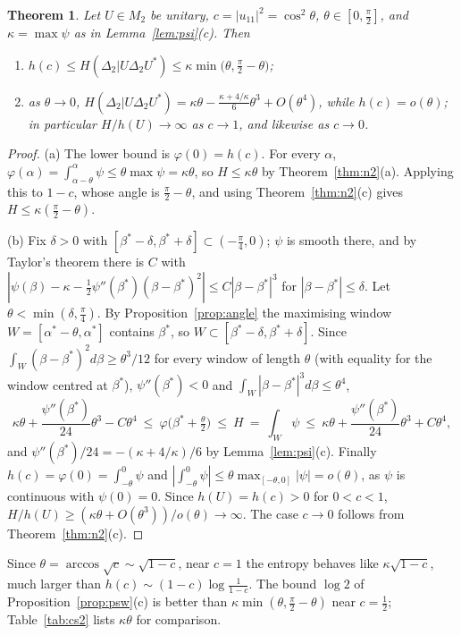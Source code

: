 \documentclass[11pt]{article}
\theoremstyle{plain}
\newtheorem{theorem}{Theorem}[section]
\theoremstyle{definition}
\theoremstyle{remark}
\begin{document}
\begin{theorem}\label{thm:bound}
Let $U\in M_2$ be unitary, $c=|u_{11}|^2=\cos^2\theta$, $\theta\in[0,\frac\pi2]$, and $\kappa=\max\psi$ as in
Lemma~\ref{lem:psi}(c). Then
\begin{enumerate}
\item[(a)] $h(c)\le H(\Delta_2|U\Delta_2U^*)\le\kappa\min\bigl(\theta,\frac\pi2-\theta\bigr)$;
\item[(b)] as $\theta\to0$,
$H(\Delta_2|U\Delta_2U^*)=\kappa\theta-\frac{\kappa+4/\kappa}6\theta^3+O(\theta^4)$, while $h(c)=o(\theta)$; in particular
$H/h(U)\to\infty$ as $c\to1$, and likewise as $c\to0$.
\end{enumerate}
\end{theorem}
\begin{proof}
(a) The lower bound is $\varphi(0)=h(c)$. For every $\alpha$, $\varphi(\alpha)=\int_{\alpha-\theta}^\alpha\psi\le\theta\max\psi=\kappa\theta$, so
$H\le\kappa\theta$ by Theorem~\ref{thm:n2}(a). Applying this to $1-c$, whose angle is $\frac\pi2-\theta$, and using
Theorem~\ref{thm:n2}(c) gives $H\le\kappa(\frac\pi2-\theta)$.

(b) Fix $\delta>0$ with $[\beta^*-\delta,\beta^*+\delta]\subset(-\frac\pi4,0)$; $\psi$ is smooth there, and by Taylor's theorem
there is $C$ with $|\psi(\beta)-\kappa-\frac12\psi''(\beta^*)(\beta-\beta^*)^2|\le C|\beta-\beta^*|^3$ for $|\beta-\beta^*|\le\delta$. Let
$\theta<\min(\delta,\frac\pi4)$. By Proposition~\ref{prop:angle} the maximising window $W=[\alpha^*-\theta,\alpha^*]$ contains
$\beta^*$, so $W\subset[\beta^*-\delta,\beta^*+\delta]$. Since $\int_W(\beta-\beta^*)^2d\beta\ge\theta^3/12$ for every window of length
$\theta$ (with equality for the window centred at $\beta^*$), $\psi''(\beta^*)<0$ and $\int_W|\beta-\beta^*|^3d\beta\le\theta^4$,
\[
  \kappa\theta+\frac{\psi''(\beta^*)}{24}\theta^3-C\theta^4\ \le\ \varphi\bigl(\beta^*+\tfrac\theta2\bigr)\ \le\ H\ =\ \int_W\psi\ \le\
  \kappa\theta+\frac{\psi''(\beta^*)}{24}\theta^3+C\theta^4 ,
\]
and $\psi''(\beta^*)/24=-(\kappa+4/\kappa)/6$ by Lemma~\ref{lem:psi}(c). Finally $h(c)=\varphi(0)=\int_{-\theta}^0\psi$ and
$|\int_{-\theta}^0\psi|\le\theta\max_{[-\theta,0]}|\psi|=o(\theta)$, as $\psi$ is continuous with $\psi(0)=0$. Since $h(U)=h(c)>0$
for $0<c<1$, $H/h(U)\ge(\kappa\theta+O(\theta^3))/o(\theta)\to\infty$. The case $c\to0$ follows from Theorem~\ref{thm:n2}(c).
\end{proof}

\noindent Since $\theta=\arccos\sqrt c\sim\sqrt{1-c}$, near $c=1$ the entropy behaves like $\kappa\sqrt{1-c}$, much larger than
$h(c)\sim(1-c)\log\frac1{1-c}$. The bound $\log2$ of Proposition~\ref{prop:psw}(c) is better than $\kappa\min(\theta,\frac\pi2-\theta)$
near $c=\frac12$; Table~\ref{tab:cs2} lists $\kappa\theta$ for comparison.
\end{document}
